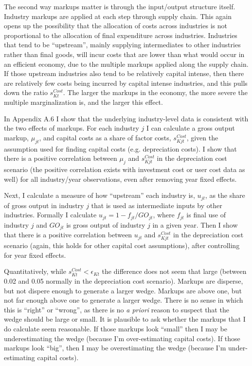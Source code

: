 \documentclass[11pt]{article}
\begin{document}
The second way markups matter is through the input/output structure itself. Industry markups are applied at each step through supply chain. This again opens up the possibility that the allocation of costs across industries is not proportional to the allocation of final expenditure across industries. Industries that tend to be ``upstream'', mainly supplying intermediates to other industries rather than final goods, will incur costs that are lower than what would occur in an efficient economy, due to the multiple markups applied along the supply chain. If those upstream industries also tend to be relatively capital intense, then there are relatively few costs being incurred by capital intense industries, and this pulls down the ratio $s_{Kt}^{Cost}$. The larger the markups in the economy, the more severe the multiple marginalization is, and the larger this effect.

In Appendix A.6 I show that the underlying industry-level data is consistent with the two effects of markups. For each industry $j$ I can calculate a gross output markup, $\mu_{jt}$, and capital costs as a share of factor costs, $s_{Kjt}^{Cost}$, given the assumption used for finding capital costs (e.g. depreciation costs). I show that there is a positive correlation between $\mu_j$ and $s_{Kjt}^{Cost}$ in the depreciation cost scenario (the positive correlation exists with investment cost or user cost data as well) for all industry/year observations, even after removing year fixed effects.

Next, I calculate a measure of how ``upstream'' each industry is, $u_{jt}$, as the share of gross output in industry $j$ that is used as intermediate inputs by other industries. Formally I calculate $u_{jt} = 1 - f_{jt}/GO_{jt}$, where $f_{jt}$ is final use of industry $j$ and $GO_{jt}$ is gross output of industry $j$ in a given year. Then I show that there is a positive correlation between $u_{jt}$ and $s_{Kjt}^{Cost}$ in the depreciation cost scenario (again, this holds for other capital cost assumptions), after controlling for year fixed effects.

Quantitatively, while $s_{Kt}^{Cost} < \epsilon_{Kt}$ the difference does not seem that large (between 0.02 and 0.05 normally in the depreciation cost scenario). Markups are disperse, but not dispere enough to generate a larger wedge. Markups are above one, but not far enough above one to generate a larger wedge. There is no sense in which this is ``right'' or ``wrong'', as there is no \textit{a priori} reason to suspect that the wedge should be large or small. It is plausible to ask whether the markups that I do calculate seem reasonable. If those markups look ``small'' then I may be underestimating the wedge (because I'm over-estimating capital costs). If those markups look ``big'', then I may be overestimating the wedge (because I'm under-estimating capital costs). 
\end{document}
